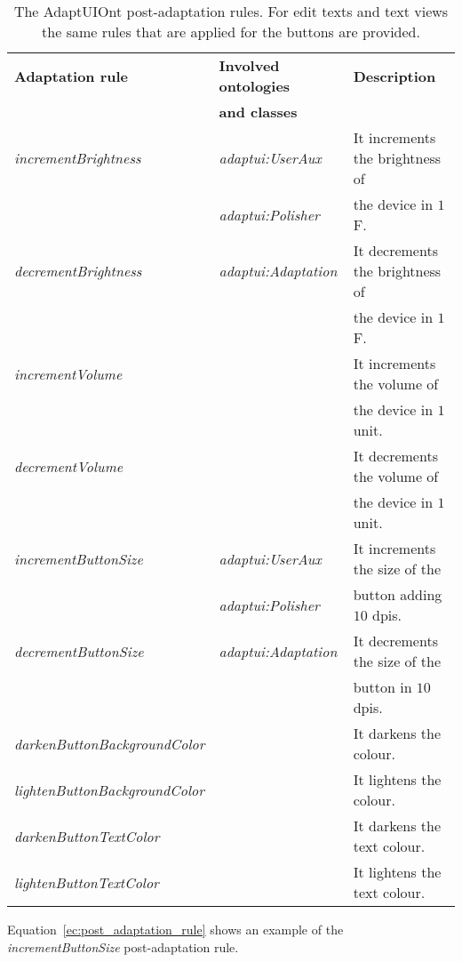\begin{table}
  \caption{The AdaptUIOnt post-adaptation rules. For edit texts and text views
  the same rules that are applied for the buttons are provided.}
 \label{tbl:post_adaptation_rules}
\footnotesize
\centering
 \begin{tabular}{l l l}
  \hline 
  \textbf{Adaptation rule} 	& \textbf{Involved ontologies} 	& \textbf{Description} 		\\
				& \textbf{and classes} 		& 				\\
  \hline
  \textit{incrementBrightness}	& \textit{adaptui:UserAux}	& It increments the brightness of\\
				& \textit{adaptui:Polisher}	& the device in $1$F.		\\
  \textit{decrementBrightness}	& \textit{adaptui:Adaptation}	& It decrements the brightness of\\
				& 				& the device in $1$F.		\\
  \textit{incrementVolume}	& 				& It increments the volume of	\\
				& 				& the device in $1$ unit.	\\
  \textit{decrementVolume}	& 				& It decrements the volume of	\\
				& 				& the device in $1$ unit.	\\
  \hline
  \textit{incrementButtonSize}	& \textit{adaptui:UserAux}	& It increments the size of the \\
				& \textit{adaptui:Polisher}	& button adding $10$ dpis. 	\\
  \textit{decrementButtonSize}	& \textit{adaptui:Adaptation}	& It decrements the size of the \\
				& 				& button in $10$ dpis.		\\
  \textit{darkenButtonBackgroundColor}&				& It darkens the colour.	\\
  \textit{lightenButtonBackgroundColor}&			& It lightens the colour.	\\
  \textit{darkenButtonTextColor}&				& It darkens the text colour.	\\
  \textit{lightenButtonTextColor}&				& It lightens the text colour.	\\
  \hline
\end{tabular}
\end{table}

Equation~\ref{ec:post_adaptation_rule} shows an example of the \textit{incrementButtonSize} 
post-adaptation rule.

